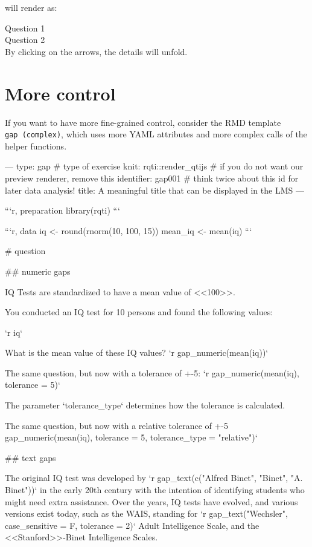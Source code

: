 \documentclass[twoside]{tufte-book}
\newenvironment{Shaded}{}{}
\begin{document}
will render as:

\noindent\textrightarrow{} Question 1\\
\noindent\textrightarrow{} Question 2\\

By clicking on the arrows, the details will unfold.

\section{More control}\label{more-control-2}

If you want to have more fine-grained control, consider the RMD template \texttt{gap\ (complex)}, which uses more YAML attributes and more complex calls of the helper functions.

\begin{Shaded}
\begin{Highlighting}
---
type: gap # type of exercise
knit: rqti::render_qtijs # if you do not want our preview renderer, remove this
identifier: gap001 # think twice about this id for later data analysis!
title: A meaningful title that can be displayed in the LMS
---

```{r, preparation}
library(rqti)
```

```{r, data}
iq <- round(rnorm(10, 100, 15))
mean_iq <- mean(iq)
```

# question

## numeric gaps

IQ Tests are standardized to have a mean value of <<100>>.

You conducted an IQ test for 10 persons and found the following values:

`r iq`

What is the mean value of these IQ values? `r gap_numeric(mean(iq))`

The same question, but now with a tolerance of +-5: `r gap_numeric(mean(iq),
tolerance = 5)`

The parameter `tolerance_type` determines how the tolerance is calculated.

The same question, but now with a relative tolerance of +-5%: `r
gap_numeric(mean(iq), tolerance = 5, tolerance_type = "relative")`

## text gaps

The original IQ test was developed by `r gap_text(c("Alfred Binet", "Binet", "A.
Binet"))` in the early 20th century with the intention of identifying students
who might need extra assistance. Over the years, IQ tests have evolved, and
various versions exist today, such as the WAIS, standing for `r
gap_text("Wechsler", case_sensitive = F, tolerance = 2)` Adult Intelligence
Scale, and the <<Stanford>>-Binet Intelligence Scales.


\end{Highlighting}
\end{Shaded}
\end{document}
